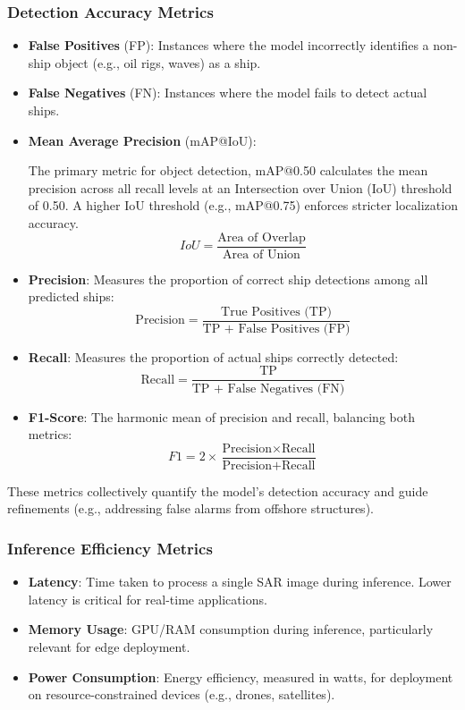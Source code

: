 \documentclass{article}
\begin{document}
\subsubsection{Detection Accuracy Metrics}
\begin{itemize}
    \item \textbf{False Positives} (FP): Instances where the model incorrectly identifies a non-ship object (e.g., oil rigs, waves) as a ship. \item \textbf{False Negatives} (FN): Instances where the model fails to detect actual ships. \item \textbf{Mean Average Precision} (mAP@IoU):
    
    The primary metric for object detection, mAP@0.50 calculates the mean precision across all recall levels at an Intersection over Union (IoU) threshold of 0.50. A higher IoU threshold (e.g., mAP@0.75) enforces stricter localization accuracy. $$IoU=\frac{\text{Area of Overlap}}{\text{Area of Union}}$$
    \item \textbf{Precision}: Measures the proportion of correct ship detections among all predicted ships: $$\text{Precision} = \frac{\text{True Positives (TP)}}{\text{TP + False Positives (FP)}}$$
    
    \item \textbf{Recall}: Measures the proportion of actual ships correctly detected:$$\text{Recall} = \frac{\text{TP}}{\text{TP + False Negatives (FN)}}$$
    
    \item \textbf{F1-Score}: The harmonic mean of precision and recall, balancing both metrics:
    $$F1 = 2 \times \frac{\text{Precision} \times \text{Recall}}{\text{Precision} + \text{Recall}}$$
\end{itemize}
 
These metrics collectively quantify the model’s detection accuracy and guide refinements (e.g., addressing false alarms from offshore structures).

\subsubsection{Inference Efficiency Metrics}
\begin{itemize}
    \item \textbf{Latency}: Time taken to process a single SAR image during inference. Lower latency is critical for real-time applications.

    \item \textbf{Memory Usage}: GPU/RAM consumption during inference, particularly relevant for edge deployment. \item \textbf{Power Consumption}: Energy efficiency, measured in watts, for deployment on resource-constrained devices (e.g., drones, satellites). \end{itemize}
\end{document}
